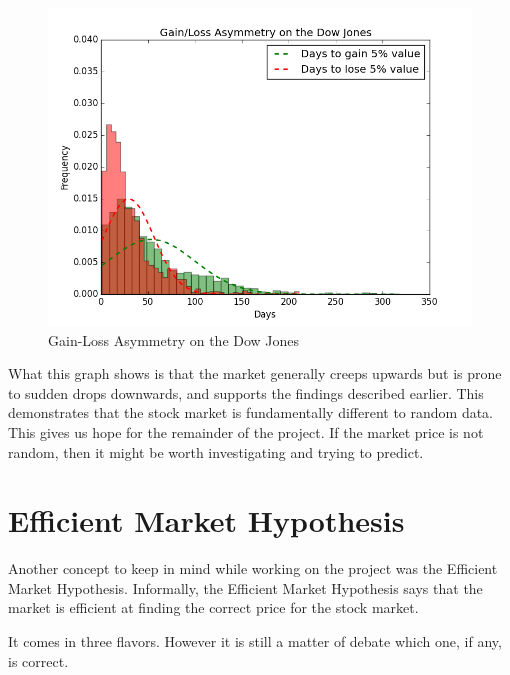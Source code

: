 \documentclass{report}
\begin{document}
\begin{figure}[H]
	\caption{Gain-Loss Asymmetry on the Dow Jones}
	\centerline{\includegraphics[width=\textwidth]{vis/gain_loss_asymmetry.png}}
	\label{fig:gain-loss-asymm}
\end{figure}

What this graph shows is that the market generally creeps upwards but is prone to sudden drops downwards, and supports the findings described earlier. This demonstrates that the stock market is fundamentally different to random data. This gives us hope for the remainder of the project. If the market price is not random, then it might be worth investigating and trying to predict.

\section{Efficient Market Hypothesis}

Another concept to keep in mind while working on the project was the Efficient Market Hypothesis. Informally, the Efficient Market Hypothesis says that the market is efficient at finding the correct price for the stock market.

It comes in three flavors. However it is still a matter of debate which one, if any, is correct.
\end{document}
